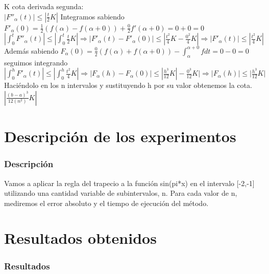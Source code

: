 \documentclass{beamer}
\begin{document}
\begin {frame}
K cota derivada segunda:\\
$|F''_\alpha(t)| \leq |\frac{t}{2} K|$
\pause
Integramos sabiendo $F'_\alpha(0)=\frac {1}{2} \left(f(\alpha)-f(\alpha+0) \right)+ \frac{0}{2} f'(\alpha+0)=0+0=0$\\
\pause
$|\int_0^t F''_\alpha(t)| \leq |\int_0^t\frac{t}{2} K| \Rightarrow |F'_\alpha(t)-F'_\alpha(0)| \leq |\frac{t^2}{4} K-\frac{0^2}{4} K| \Rightarrow |F'_\alpha(t)| \leq |\frac{t^2}{4} K|$
\pause
Además sabiendo
$F_\alpha(0)=\frac{0}{2} \left(f(\alpha)+f(\alpha+0) \right)-\int_\alpha ^{\alpha+0} f dt=0-0=0$ seguimos integrando\\

$|\int_0^h F'_\alpha(t)|\leq|\int_0^h \frac{t^2}{4} K| \Rightarrow |F_\alpha(h)-F_\alpha(0)| \leq |\frac{h^3}{12} K|-\frac{0^3}{12} K|\Rightarrow |F_\alpha(h)| \leq |\frac{h^3}{12} K|$
\pause
Haciéndolo en los n intervalos y sustituyendo h por su valor obtenemos la cota.\\

$|\frac{(b-a)^3}{12 (n^2)} K|$
\end{frame}
\section{Descripción de los experimentos}
\begin{frame}
  \frametitle{Descripción}
  Vamos a aplicar la regla del trapecio a la función sin(pi*x) en el intervalo [-2,-1] utilizando una cantidad variable de subintervalos, n. Para cada valor de n, mediremos el error absoluto y el tiempo de ejecución del método.
\end{frame}

\section{Resultados obtenidos}
\begin{frame}
  \frametitle{Resultados}
  
\end{frame}
\end{document}
